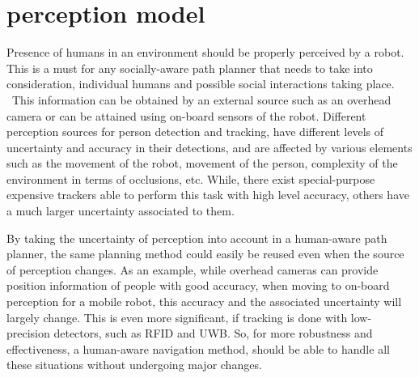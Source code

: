 \section{perception model}
\label{perception_model}


Presence of humans in an environment should be properly perceived by a robot. This is a must for any socially-aware path planner that needs to take into consideration, individual humans and possible social interactions taking place.%
~This information can be obtained by an external source such as an overhead camera or can be attained using on-board sensors of the robot. Different perception sources for person detection and tracking, have different levels of uncertainty and accuracy in their detections, and are affected by various elements such as the movement of the robot, movement of the person, complexity of the environment in terms of occlusions, etc. While, there exist special-purpose expensive trackers able to perform this task with high level accuracy, others have a much larger uncertainty associated to them. 

By taking the uncertainty of perception into account in a human-aware path planner, the same planning method could easily be reused even when the source of perception changes. As an example, while overhead cameras can provide position information of people with good accuracy, when moving to on-board perception for a mobile robot, this accuracy and the associated uncertainty will largely change. This is even more significant, if tracking is done with low-precision detectors, such as RFID and UWB. So, for more robustness and effectiveness, a human-aware navigation method, should be able to handle all these situations without undergoing major changes.




